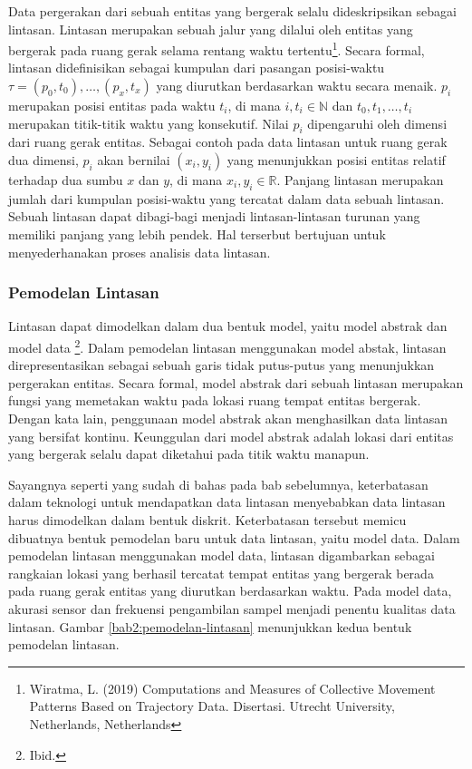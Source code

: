 \documentclass[a4paper,twoside]{article}
\begin{document}
Data pergerakan dari sebuah entitas yang bergerak selalu dideskripsikan sebagai lintasan. Lintasan merupakan sebuah jalur yang dilalui oleh entitas yang bergerak pada ruang gerak selama rentang waktu tertentu\footnote{Wiratma, L. (2019) Computations and Measures of Collective Movement Patterns Based on Trajectory Data. Disertasi. Utrecht University, Netherlands, Netherlands}. Secara formal, lintasan didefinisikan sebagai kumpulan dari pasangan posisi-waktu $\tau = (p_0, t_0), \ldots, (p_x, t_x)$ yang diurutkan berdasarkan waktu secara menaik. $p_i$ merupakan posisi entitas pada waktu $t_i$, di mana $i, t_i \in \mathbb{N}$ dan $t_0, t_1, \ldots, t_i$ merupakan titik-titik waktu yang konsekutif. Nilai $p_i$ dipengaruhi oleh dimensi dari ruang gerak entitas. Sebagai contoh pada data lintasan untuk ruang gerak dua dimensi, $p_i$ akan bernilai $(x_i, y_i)$ yang menunjukkan posisi entitas relatif terhadap dua sumbu $x$ dan $y$, di mana $x_i, y_i \in \mathbb{R}$. Panjang lintasan merupakan jumlah dari kumpulan posisi-waktu yang tercatat dalam data sebuah lintasan. Sebuah lintasan dapat dibagi-bagi menjadi lintasan-lintasan turunan yang memiliki panjang yang lebih pendek. Hal terserbut bertujuan untuk menyederhanakan proses analisis data lintasan.

\subsubsection{Pemodelan Lintasan}

Lintasan dapat dimodelkan dalam dua bentuk model, yaitu model abstrak dan model data \footnote{Ibid.}. Dalam pemodelan lintasan menggunakan model abstak, lintasan direpresentasikan sebagai sebuah garis tidak putus-putus yang menunjukkan pergerakan entitas. Secara formal, model abstrak dari sebuah lintasan merupakan fungsi yang memetakan waktu pada lokasi ruang tempat entitas bergerak. Dengan kata lain, penggunaan model abstrak akan menghasilkan data lintasan yang bersifat kontinu. Keunggulan dari model abstrak adalah lokasi dari entitas yang bergerak selalu dapat diketahui pada titik waktu manapun. 

Sayangnya seperti yang sudah di bahas pada bab sebelumnya, keterbatasan dalam teknologi untuk mendapatkan data lintasan menyebabkan data lintasan harus dimodelkan dalam bentuk diskrit. Keterbatasan tersebut memicu dibuatnya bentuk pemodelan baru untuk data lintasan, yaitu model data. Dalam pemodelan lintasan menggunakan model data, lintasan digambarkan sebagai rangkaian lokasi yang berhasil tercatat tempat entitas yang bergerak berada pada ruang gerak entitas yang diurutkan berdasarkan waktu. Pada model data, akurasi sensor dan frekuensi pengambilan sampel menjadi penentu kualitas data lintasan. Gambar \ref{bab2:pemodelan-lintasan} menunjukkan kedua bentuk pemodelan lintasan.
\end{document}
